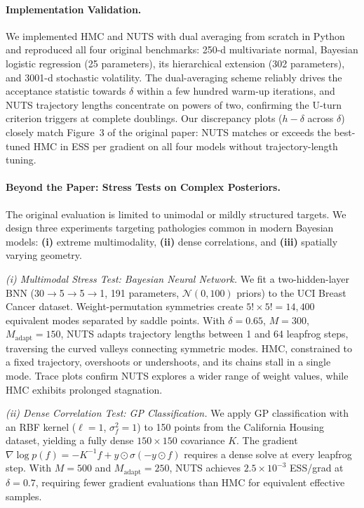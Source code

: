 \documentclass{article}
\begin{document}
\paragraph{Implementation Validation.}
We implemented HMC and NUTS with dual averaging from scratch in Python and reproduced all four original benchmarks: 250-d multivariate normal, Bayesian logistic regression (25 parameters), its hierarchical extension (302 parameters), and 3001-d stochastic volatility. The dual-averaging scheme reliably drives the acceptance statistic towards $\delta$ within a few hundred warm-up iterations, and NUTS trajectory lengths concentrate on powers of two, confirming the U-turn criterion triggers at complete doublings. Our discrepancy plots ($h - \delta$ across $\delta$) closely match Figure~3 of the original paper: NUTS matches or exceeds the best-tuned HMC in ESS per gradient on all four models without trajectory-length tuning.

\paragraph{Beyond the Paper: Stress Tests on Complex Posteriors.}
The original evaluation is limited to unimodal or mildly structured targets. We design three experiments targeting pathologies common in modern Bayesian models: \textbf{(i)} extreme multimodality, \textbf{(ii)} dense correlations, and \textbf{(iii)} spatially varying geometry.

\vspace{0.1cm}
\noindent\textit{(i) Multimodal Stress Test: Bayesian Neural Network.}
We fit a two-hidden-layer BNN (30$\to$5$\to$5$\to$1, 191 parameters, $\mathcal{N}(0,100)$ priors) to the UCI Breast Cancer dataset. Weight-permutation symmetries create $5!\times5!=14{,}400$ equivalent modes separated by saddle points. With $\delta=0.65$, $M=300$, $M_{\text{adapt}}=150$, NUTS adapts trajectory lengths between 1 and 64 leapfrog steps, traversing the curved valleys connecting symmetric modes. HMC, constrained to a fixed trajectory, overshoots or undershoots, and its chains stall in a single mode. Trace plots confirm NUTS explores a wider range of weight values, while HMC exhibits prolonged stagnation.

\noindent\textit{(ii) Dense Correlation Test: GP Classification.}
We apply GP classification with an RBF kernel ($\ell=1$, $\sigma_f^2=1$) to 150 points from the California Housing dataset, yielding a fully dense $150\times150$ covariance $K$. The gradient $\nabla\log p(f) = -K^{-1}f + y\odot\sigma(-y\odot f)$ requires a dense solve at every leapfrog step. With $M=500$ and $M_{\text{adapt}}=250$, NUTS achieves $2.5\times10^{-3}$ ESS/grad at $\delta=0.7$, requiring fewer gradient evaluations than HMC for equivalent effective samples.
\end{document}
